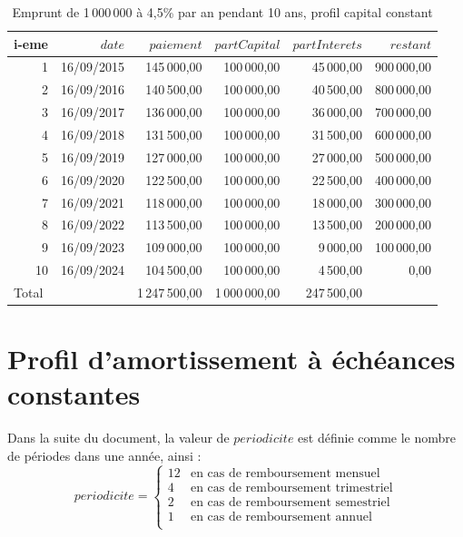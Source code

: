 \documentclass[11pt,a4paper]{scrartcl}
\begin{document}
\begin{table}
\centering
\caption{Emprunt de 1\,000\,000 à 4,5\% par an pendant 10 ans, profil capital constant}
\begin{tabular}{rrrrrr}
i-eme & $date$ & $paiement$ & $partCapital$ & $partInterets$ & $restant$ \\ 
	\hline
	1 & 16/09/2015 & 145\,000,00& 100\,000,00& 45\,000,00&900\,000,00\\ 
	2 & 16/09/2016 & 140\,500,00& 100\,000,00& 40\,500,00&800\,000,00\\ 
	3 & 16/09/2017 & 136\,000,00& 100\,000,00& 36\,000,00&700\,000,00\\ 
	4 & 16/09/2018 & 131\,500,00& 100\,000,00& 31\,500,00&600\,000,00\\ 
	5 & 16/09/2019 & 127\,000,00& 100\,000,00& 27\,000,00&500\,000,00\\ 
	6 & 16/09/2020 & 122\,500,00& 100\,000,00& 22\,500,00&400\,000,00\\ 
	7 & 16/09/2021 & 118\,000,00& 100\,000,00& 18\,000,00&300\,000,00\\ 
	8 & 16/09/2022 & 113\,500,00& 100\,000,00& 13\,500,00&200\,000,00\\ 
	9 & 16/09/2023 & 109\,000,00& 100\,000,00& 9\,000,00&100\,000,00\\ 
	10& 16/09/2024 & 104\,500,00& 100\,000,00& 4\,500,00& 0,00\\ 
	\hline
	\multicolumn{1}{l}{Total} & \multicolumn{1}{l}{} & 1\,247\,500,00 & 1\,000\,000,00 & 247\,500,00 & \\ 
\end{tabular}
\label{tblAmort2}
\end{table}


\section{Profil d'amortissement à échéances constantes}
Dans la suite du document, la valeur de $periodicite$ est définie comme le nombre de périodes dans une année, ainsi :
\begin{equation}
	periodicite =
	\begin{cases}
		12 & \text{en cas de remboursement mensuel} \\
		4 & \text{en cas de remboursement trimestriel} \\
		2 & \text{en cas de remboursement semestriel} \\
		1 & \text{en cas de remboursement annuel} \\
	\end{cases}
	\label{eqnperiodicite}
\end{equation}
\end{document}
